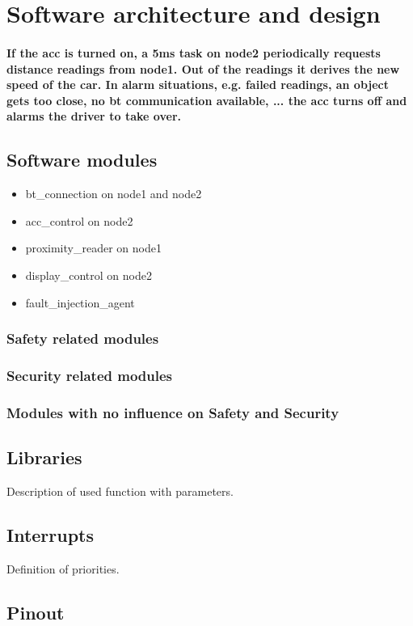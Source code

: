 \section{Software architecture and design}
\label{chapter2}

\paragraph
{
	If the acc is turned on, a 5ms task on node2 periodically requests distance readings from node1. Out of the
	readings it derives the new speed of the car. In alarm situations, e.g. failed readings, an object gets too close,
	no bt communication available, ... the acc turns off and alarms the driver to take over.
}

\subsection{Software modules}

\begin{itemize}
	\item bt\_connection on node1 and node2
	\item acc\_control on node2
	\item proximity\_reader on node1
	\item display\_control on node2
	\item fault\_injection\_agent
\end{itemize}


\subsubsection{Safety related modules}


\subsubsection{Security related modules}

\subsubsection{Modules with no influence on Safety and Security}

\subsection{Libraries}

Description of used function with parameters.


\subsection{Interrupts}

Definition of priorities.

\subsection{Pinout}

